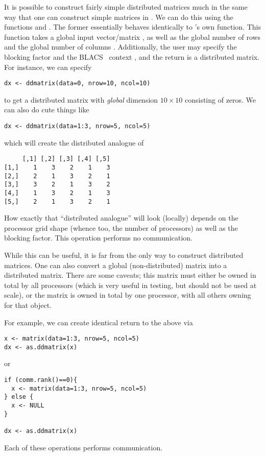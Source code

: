 It is possible to construct fairly simple distributed matrices much in the same 
way that one can construct simple matrices in .  We can do this 
using the functions
 and
.
The former essentially behaves identically to 's own  
function.  This function takes a global input vector/matrix , as 
well as the global number of rows  and the global number of columns 
.  Additionally, the user may specify the blocking factor 
 and the BLACS~ context , and the 
return is a distributed matrix.  For instance, we can specify
\begin{lstlisting}[language=rr,title=ddmatrix()]
dx <- ddmatrix(data=0, nrow=10, ncol=10)
\end{lstlisting}
to get a distributed matrix with \emph{global} dimension $10\times 10$ 
consisting of zeros.  We can also do cute things like
\begin{lstlisting}[language=rr,title=ddmatrix()]
dx <- ddmatrix(data=1:3, nrow=5, ncol=5)
\end{lstlisting}
which will create the distributed analogue of
\begin{verbatim}
     [,1] [,2] [,3] [,4] [,5]
[1,]    1    3    2    1    3
[2,]    2    1    3    2    1
[3,]    3    2    1    3    2
[4,]    1    3    2    1    3
[5,]    2    1    3    2    1
\end{verbatim}
How exactly that ``distributed analogue'' will look (locally) depends on the 
processor grid shape (whence too, the number of processors) as well as the 
blocking factor.  This operation performs no communication.

While this can be useful, it is far from the only way to construct distributed 
matrices.  One can also convert a global (non-distributed) matrix into a 
distributed matrix.  There are some caveats; this matrix must either be owned in 
total by all processors (which is very useful in testing, but should not be used 
at scale), or the matrix is owned in total by one processor, with all others 
owning  for that object.  

For example, we can create identical return to the above via
\begin{lstlisting}[language=rr,title=as.ddmatrix()]
x <- matrix(data=1:3, nrow=5, ncol=5)
dx <- as.ddmatrix(x)
\end{lstlisting}
or
\begin{lstlisting}[language=rr,title=as.ddmatrix()]
if (comm.rank()==0){
  x <- matrix(data=1:3, nrow=5, ncol=5)
} else {
  x <- NULL
}

dx <- as.ddmatrix(x)
\end{lstlisting}
Each of these operations performs communication.

